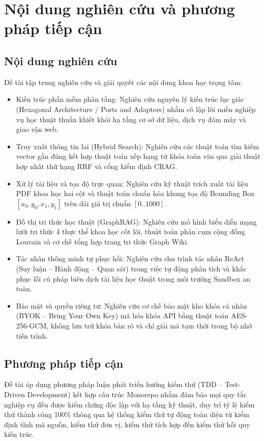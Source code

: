 \section{Nội dung nghiên cứu và phương pháp tiếp cận}
\label{sec:noi_dung}

\subsection{Nội dung nghiên cứu}
\label{subsec:noi_dung_nghien_cuu}
Đề tài tập trung nghiên cứu và giải quyết các nội dung khoa học trọng tâm:
\begin{itemize}
    \item Kiến trúc phần mềm phân tầng: Nghiên cứu nguyên lý kiến trúc lục giác (Hexagonal Architecture / Ports and Adapters) nhằm cô lập lõi miền nghiệp vụ học thuật thuần khiết khỏi hạ tầng cơ sở dữ liệu, dịch vụ đám mây và giao vận web.
    \item Truy xuất thông tin lai (Hybrid Search): Nghiên cứu các thuật toán tìm kiếm vector gần đúng kết hợp thuật toán xếp hạng từ khóa toàn văn qua giải thuật hợp nhất thứ hạng RRF và cổng kiểm định CRAG.
    \item Xử lý tài liệu và tọa độ trực quan: Nghiên cứu kỹ thuật trích xuất tài liệu PDF khoa học hai cột và thuật toán chuẩn hóa khung tọa độ Bounding Box $[x_0, y_0, x_1, y_1]$ trên dải giá trị chuẩn $[0..1000]$.
    \item Đồ thị tri thức học thuật (GraphRAG): Nghiên cứu mô hình biểu diễn mạng lưới tri thức 4 thực thể khoa học cốt lõi, thuật toán phân cụm cộng đồng Louvain và cơ chế tổng hợp trang tri thức Graph Wiki.
    \item Tác nhân thông minh tự phục hồi: Nghiên cứu chu trình tác nhân ReAct (Suy luận -- Hành động -- Quan sát) trong việc tự động phân tích và khắc phục lỗi cú pháp biên dịch tài liệu học thuật trong môi trường Sandbox an toàn.
    \item Bảo mật và quyền riêng tư: Nghiên cứu cơ chế bảo mật kho khóa cá nhân (BYOK -- Bring Your Own Key) mã hóa khóa API bằng thuật toán AES-256-GCM, không lưu trữ khóa bản rõ và chỉ giải mã tạm thời trong bộ nhớ tiến trình.
\end{itemize}

\subsection{Phương pháp tiếp cận}
\label{subsec:phuong_phap_tiep_can}
Đề tài áp dụng phương pháp luận phát triển hướng kiểm thử (TDD -- Test-Driven Development) kết hợp cấu trúc Monorepo nhằm đảm bảo mọi quy tắc nghiệp vụ đều được kiểm chứng độc lập với hạ tầng kỹ thuật, duy trì tỷ lệ kiểm thử thành công 100\% thông qua hệ thống kiểm thử tự động toàn diện từ kiểm định tĩnh mã nguồn, kiểm thử đơn vị, kiểm thử tích hợp đến kiểm thử hồi quy kiến trúc.
